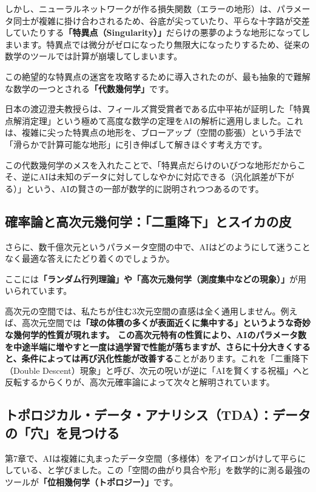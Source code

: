 しかし、ニューラルネットワークが作る損失関数（エラーの地形）は、パラメータ同士が複雑に掛け合わされるため、谷底が尖っていたり、平らな十字路が交差していたりする\textbf{「特異点（Singularity）」}だらけの悪夢のような地形になってしまいます。特異点では微分がゼロになったり無限大になったりするため、従来の数学のツールでは計算が崩壊してしまいます。

この絶望的な特異点の迷宮を攻略するために導入されたのが、最も抽象的で難解な数学の一つとされる\textbf{「代数幾何学」}です。

日本の渡辺澄夫教授らは、フィールズ賞受賞者である広中平祐が証明した「特異点解消定理」という極めて高度な数学の定理をAIの解析に適用しました。これは、複雑に尖った特異点の地形を、ブローアップ（空間の膨張）という手法で「滑らかで計算可能な地形」に引き伸ばして解きほぐす考え方です。

この代数幾何学のメスを入れたことで、「特異点だらけのいびつな地形だからこそ、逆にAIは未知のデータに対してしなやかに対応できる（汎化誤差が下がる）」という、AIの賢さの一部が数学的に説明されつつあるのです。

\subsection{確率論と高次元幾何学：「二重降下」とスイカの皮}

さらに、数千億次元というパラメータ空間の中で、AIはどのようにして迷うことなく最適な答えにたどり着くのでしょうか。

ここには\textbf{「ランダム行列理論」や「高次元幾何学（測度集中などの現象）」}が用いられています。

高次元の空間では、私たちが住む3次元空間の直感は全く通用しません。例えば、高次元空間では\textbf{「球の体積の多くが表面近くに集中する」というような奇妙な幾何学的性質が現れます。 この高次元特有の性質により、AIのパラメータ数を中途半端に増やすと一度は過学習で性能が落ちますが、さらに十分大きくすると、条件によっては再び汎化性能が改善する}ことがあります。これを「二重降下（Double Descent）現象」と呼び、次元の呪いが逆に「AIを賢くする祝福」へと反転するからくりが、高次元確率論によって次々と解明されています。

\subsection{トポロジカル・データ・アナリシス（TDA）：データの「穴」を見つける}

第7章で、AIは複雑に丸まったデータ空間（多様体）をアイロンがけして平らにしている、と学びました。この「空間の曲がり具合や形」を数学的に測る最強のツールが\textbf{「位相幾何学（トポロジー）」}です。

